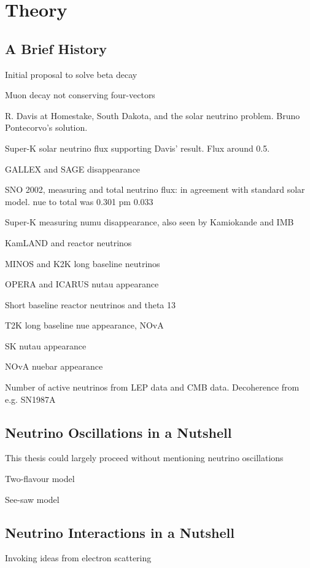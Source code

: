 \chapter{Theory}
\label{chap:theory}

\section{A Brief History}

Initial proposal to solve beta decay

Muon decay not conserving four-vectors

R. Davis at Homestake, South Dakota, and the solar neutrino problem. Bruno Pontecorvo's solution.

Super-K solar neutrino flux supporting Davis' result. Flux around 0.5.

GALLEX and SAGE \nue disappearance

SNO 2002, measuring \nue and total neutrino flux: in agreement with standard solar model. nue to total was 0.301 pm 0.033

Super-K measuring numu disappearance, also seen by Kamiokande and IMB

KamLAND and reactor neutrinos

MINOS and K2K long baseline neutrinos

OPERA and ICARUS nutau appearance

Short baseline reactor neutrinos and theta 13

T2K long baseline nue appearance, NOvA

SK nutau appearance

NOvA nuebar appearance

Number of active neutrinos from LEP data and CMB data. Decoherence from e.g. SN1987A

\section{Neutrino Oscillations in a Nutshell}
\label{sec:theory:osc}
This thesis could largely proceed without mentioning neutrino oscillations

Two-flavour model

See-saw model

\section{Neutrino Interactions in a Nutshell}
\label{sec:theory:int}
Invoking ideas from electron scattering